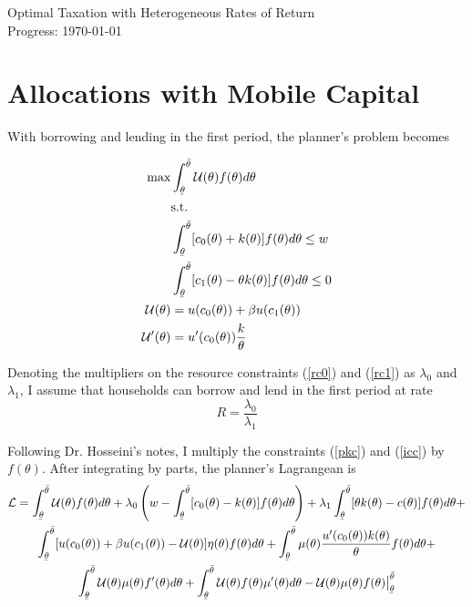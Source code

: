 \documentclass[11pt]{article}
\newcommand{\ubar}[1]{\underaccent{\bar}{#1}}
\newcommand{\p}{\prime}
\newcommand{\lagr}{\mathcal{L}}
\newcommand{\U}{\mathcal{U}}
\begin{document}
    \begin{flushleft}
        Optimal Taxation with Heterogeneous Rates of Return \\
        Progress: \today
    \end{flushleft}

\section{Allocations with Mobile Capital}

With borrowing and lending in the first period, the planner's problem becomes

\begin{align}
    \max &\int_{\ubar{\theta}}^{\bar{\theta}} \U(\theta)f(\theta)d\theta \label{s1prob} \\ 
    &\text{s.t.} \notag \\
    &\int_{\ubar{\theta}}^{\bar{\theta}}[c_0(\theta) + k(\theta)]f(\theta)d\theta \leq w \label{rc0} \\
    &\int_{\ubar{\theta}}^{\bar{\theta}} [c_1(\theta) - \theta k(\theta)]f(\theta)d\theta \leq 0 \label{rc1} \\
    \U(\theta) &= u(c_0(\theta)) + \beta u(c_1(\theta)) \label{pkc} \\
    \U^\p(\theta) &= u^\p(c_0(\theta))\frac{k}{\theta} \label{icc}
\end{align}

Denoting the multipliers on the resource constraints (\ref{rc0}) and (\ref{rc1}) as \( \lambda_0 \) and \( \lambda_1 \), I assume that households can borrow and lend in the first period at rate 
\[R = \frac{\lambda_0}{\lambda_1}\]

Following Dr. Hosseini's notes, I multiply the constraints (\ref{pkc}) and (\ref{icc}) by \( f(\theta) \). After integrating by parts, the planner's Lagrangean is 
\begin{multline}
    \lagr = \int_{\ubar{\theta}}^{\bar{\theta}} \U(\theta)f(\theta)d\theta + \lambda_0\left( w - \int_{\ubar{\theta}}^{\bar{\theta}} [c_0(\theta) - k(\theta)]f(\theta)d\theta \right) + \lambda_1 \int_{\ubar{\theta}}^{\bar{\theta}}[\theta k(\theta) - c(\theta)]f(\theta)d\theta + \\ 
    \int_{\ubar{\theta}}^{\bar{\theta}}[u(c_0(\theta)) + \beta u(c_1(\theta)) - \U(\theta)]\eta(\theta)f(\theta)d\theta +  \int_{\ubar{\theta}}^{\bar{\theta}} \mu(\theta)\frac{u^\p(c_0(\theta))k(\theta)}{\theta}f(\theta)d\theta + \\
    \int_{\ubar{\theta}}^{\bar{\theta}}\U(\theta)\mu(\theta)f^\p(\theta)d\theta + \int_{\ubar{\theta}}^{\bar{\theta}}\U(\theta)f(\theta)\mu^\p(\theta)d\theta - \U(\theta)\mu(\theta)f(\theta)\big|_{\ubar{\theta}}^{\bar{\theta}}
\end{multline}
\end{document}
